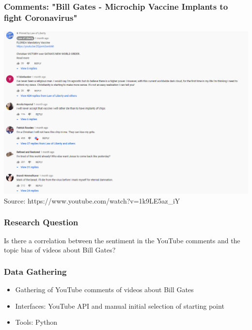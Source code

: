 \documentclass{beamer}
\begin{document}
\begin{frame}
\frametitle{Comments: "Bill Gates - Microchip Vaccine Implants to fight Coronavirus"
}
\includegraphics[height=0.7\textheight]{BillGatesmandatoryvaccines}
Source: https://www.youtube.com/watch?v=1k9LE5az\_iY
\end{frame}	
\begin{frame}
\frametitle{Research Question}
\begin{center}
Is there a correlation between the sentiment in the YouTube comments and the topic bias of videos about Bill Gates?
\end{center}

\end{frame}	


\begin{frame}
\frametitle{Data Gathering}

\begin{itemize}
	\item Gathering of YouTube comments of videos about Bill Gates
	\item Interfaces: YouTube API and manual initial selection of starting point
	\item Tools: Python 
	
\end{itemize}
\end{frame}	
\end{document}
